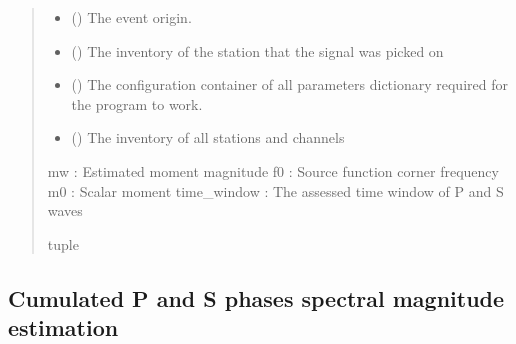 \documentclass[letterpaper,10pt,english]{sphinxmanual}
\begin{document}
\begin{fulllineitems}
\begin{quote}
\begin{description}
\begin{itemize}
\item {} 
\sphinxAtStartPar
{} () \textendash{} The event origin.

\item {} 
\sphinxAtStartPar
{} () \textendash{} The inventory of the station that the signal was picked on

\item {} 
\sphinxAtStartPar
{} () \textendash{} The configuration container of all parameters dictionary required for the program to work.

\item {} 
\sphinxAtStartPar
{} () \textendash{} The inventory of all stations and channels

\end{itemize}

\sphinxAtStartPar
mw : Estimated moment magnitude
f0 : Source function corner frequency
m0 : Scalar moment
time\_window : The assessed time window of P and S waves

\sphinxAtStartPar
tuple

\end{description}\end{quote}

\end{fulllineitems}


\subsection{Cumulated P and S phases spectral magnitude estimation}
\label{\detokenize{api_support:cumulated-p-and-s-phases-spectral-magnitude-estimation}}\label{\detokenize{api_support:module-amw.mw.double_phase_mw}}
\end{document}
